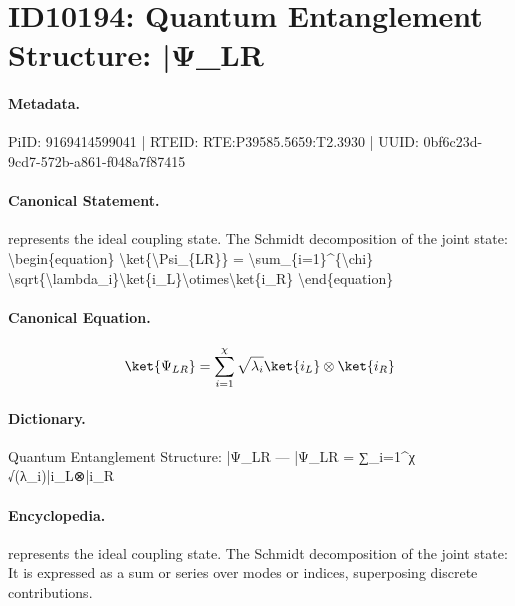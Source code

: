 \section*{ID10194: Quantum Entanglement Structure: |Ψ\_LR}
\paragraph{Metadata.}
PiID: 9169414599041 | RTEID: RTE:P39585.5659:T2.3930 | UUID: 0bf6c23d-9cd7-572b-a861-f048a7f87415

\paragraph{Canonical Statement.}
represents the ideal coupling state. The Schmidt decomposition of the joint state: \textbackslash{}begin\{equation\} \textbackslash{}ket\{\textbackslash{}Psi\_\{LR\}\} = \textbackslash{}sum\_\{i=1\}\textasciicircum{}\{\textbackslash{}chi\} \textbackslash{}sqrt\{\textbackslash{}lambda\_i\}\textbackslash{}ket\{i\_L\}\textbackslash{}otimes\textbackslash{}ket\{i\_R\} \textbackslash{}end\{equation\}

\paragraph{Canonical Equation.}
\[
\ket{\Psi_{LR}} = \sum_{i=1}^{\chi} \sqrt{\lambda_i}\ket{i_L}\otimes\ket{i_R}
\]

\paragraph{Dictionary.}
Quantum Entanglement Structure: |Ψ\_LR — |Ψ\_LR = ∑\_i=1\textasciicircum{}χ √(λ\_i)|i\_L⊗|i\_R

\paragraph{Encyclopedia.}
represents the ideal coupling state. The Schmidt decomposition of the joint state: It is expressed as a sum or series over modes or indices, superposing discrete contributions.
